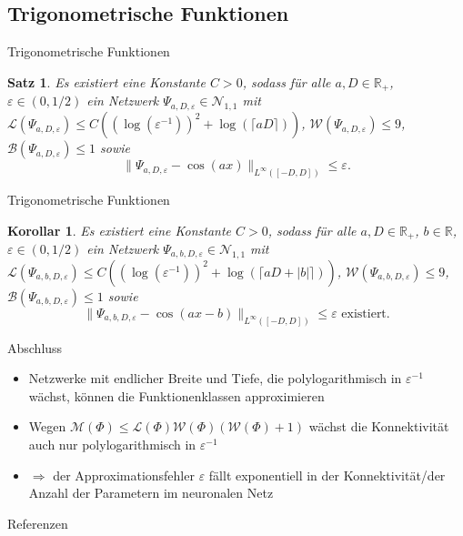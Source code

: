 \documentclass[10pt,aspectratio=169]{beamer}
\theoremstyle{plain} %
\newtheorem{satz}[theorem]{Satz}
\newtheorem{korollar}[theorem]{Korollar}
\theoremstyle{remark} %
\newcommand{\R}{\mathbb{R}} %
\newcommand{\norm}[1]{\|#1\|}
\begin{document}
\subsection{Trigonometrische Funktionen}

\begin{frame}{Trigonometrische Funktionen}
    \begin{satz} %
        \newcommand{\Psia}{\Psi_{a,D,\varepsilon}}
        Es existiert eine Konstante \(C>0\), sodass für alle \(a,D\in \R_+\), \(\varepsilon \in (0,1/2)\) 
        ein Netzwerk \(\Psia \in \mathcal{N}_{1,1}\) mit \(\mathcal{L}(\Psia) \leq C((\log(\varepsilon^{-1}))^2 + \log(\lceil aD\rceil))\), 
        \(\mathcal{W}(\Psia) \leq 9\), \(\mathcal{B}(\Psia) \leq 1\) sowie 
        \[ \norm{\Psia - \cos(a x) }_{L^{\infty}([-D,D])} \leq \varepsilon. \]
    \end{satz}
\end{frame}

\begin{frame}{Trigonometrische Funktionen}
    \begin{korollar} %
        \newcommand{\Psia}{\Psi_{a,b,D,\varepsilon}}
        Es existiert eine Konstante \(C>0\), sodass für alle \(a,D\in \R_+\), \(b\in \R\), \(\varepsilon \in (0,1/2)\) 
        ein Netzwerk \(\Psia \in \mathcal{N}_{1,1} \) mit 
        \(\mathcal{L}(\Psia) \leq C((\log(\varepsilon^{-1}))^2 + \log(\lceil a D + |b| \rceil))\), 
        \(\mathcal{W}(\Psia) \leq 9\), \(\mathcal{B}(\Psia) \leq 1\) sowie 
        \[ \norm{\Psia - \cos(a x - b) }_{L^\infty([-D,D])} \leq \varepsilon \text{ existiert}. \]
    \end{korollar}
\end{frame}

\begin{frame}{Abschluss} %
    \begin{itemize}
        \item Netzwerke mit endlicher Breite und Tiefe, die polylogarithmisch in \(\varepsilon^{-1}\) wächst, können die Funktionenklassen approximieren \pause
        \item Wegen \(\mathcal{M}(\Phi) \leq \mathcal{L}(\Phi) \mathcal{W}(\Phi)(\mathcal{W}(\Phi) + 1)\) wächst die Konnektivität auch nur polylogarithmisch in \(\varepsilon^{-1}\) \pause
        \item \( \Rightarrow \) der Approximationsfehler \(\varepsilon\) fällt exponentiell in der Konnektivität/der Anzahl der Parametern im neuronalen Netz
    \end{itemize}
\end{frame}

\begin{frame}{Referenzen}
    \footnotesize
    \nocite{Grohs2019}
    \printbibliography[heading=none]
\end{frame}
\end{document}
